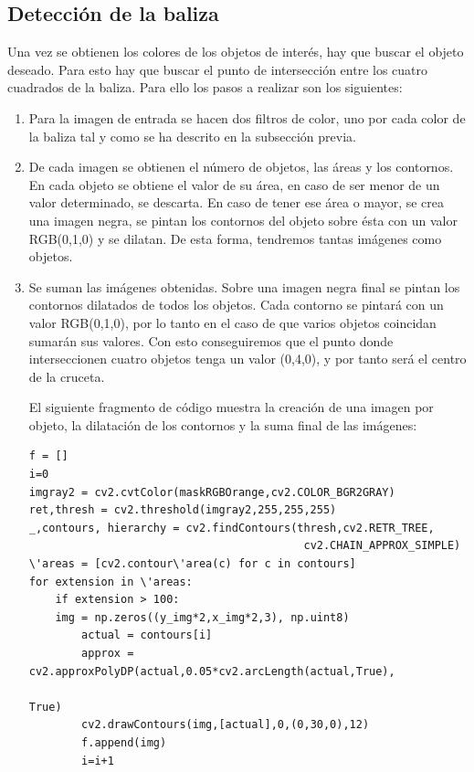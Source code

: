 \subsection{Detecci\'on de la baliza}
\hspace{1 cm} Una vez se obtienen los colores de los objetos de inter\'es, hay que buscar el objeto deseado. Para esto hay que buscar el punto de intersecci\'on entre los cuatro cuadrados de la baliza. Para ello los pasos a realizar son los siguientes:

\begin{enumerate}
	\item Para la imagen de entrada se hacen dos filtros de color, uno por cada color de la baliza tal y como se ha descrito en la subsecci\'on previa.
	\item De cada imagen se obtienen el n\'umero de objetos, las \'areas y los contornos. En cada objeto se obtiene el valor de su \'area, en caso de ser menor de un valor determinado, se descarta. En caso de tener ese \'area o mayor, se crea una imagen negra, se pintan los contornos del objeto sobre \'esta con un valor RGB(0,1,0) y se dilatan. De esta forma, tendremos tantas im\'agenes como objetos. 
	\item Se suman las im\'agenes obtenidas. Sobre una imagen negra final se pintan los contornos dilatados de todos los objetos. Cada contorno se pintar\'a con un valor RGB(0,1,0), por lo tanto en el caso de que varios objetos coincidan sumar\'an sus valores. Con esto conseguiremos que el punto donde interseccionen cuatro objetos tenga un valor (0,4,0), y por tanto ser\'a el centro de la cruceta.
	
\hspace{1 cm}El siguiente fragmento de c\'odigo muestra la creaci\'on de una imagen por objeto, la dilataci\'on de los contornos y la suma final de las im\'agenes:

\begin{lstlisting}[backgroundcolor=\color{yellow}]
f = []
i=0
imgray2 = cv2.cvtColor(maskRGBOrange,cv2.COLOR_BGR2GRAY)
ret,thresh = cv2.threshold(imgray2,255,255,255)
_,contours, hierarchy = cv2.findContours(thresh,cv2.RETR_TREE,
                                          cv2.CHAIN_APPROX_SIMPLE)
\'areas = [cv2.contour\'area(c) for c in contours]
for extension in \'areas:
    if extension > 100:
    img = np.zeros((y_img*2,x_img*2,3), np.uint8)
        actual = contours[i]
        approx = cv2.approxPolyDP(actual,0.05*cv2.arcLength(actual,True),
                                                                       True)
        cv2.drawContours(img,[actual],0,(0,30,0),12)
        f.append(img)
        i=i+1
			

\end{lstlisting}
\end{enumerate}
